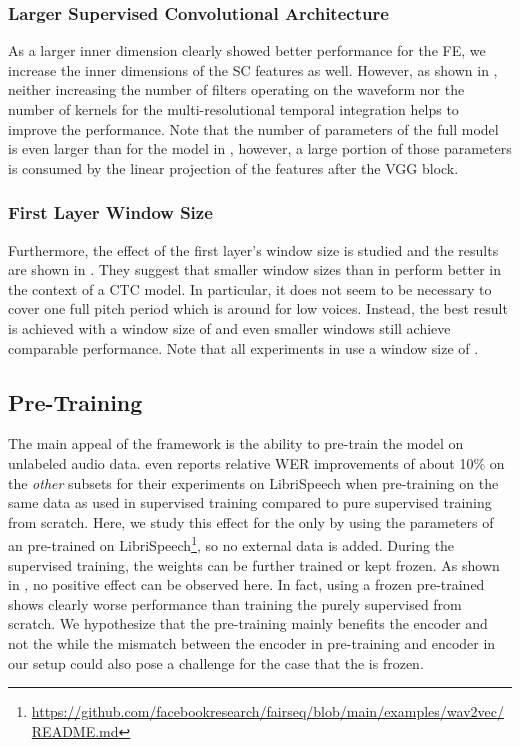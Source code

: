 \documentclass{INTERSPEECH2023}
\begin{document}
\subsubsection{Larger Supervised Convolutional Architecture}
\label{sec:scf_size}
As a larger inner dimension clearly showed better performance for the \wvtwo \gls{FE}, we increase the inner dimensions of the \gls{SC} features as well.
However, as shown in , neither increasing the number of filters operating on the waveform nor the number of kernels for the multi-resolutional temporal integration helps to improve the performance.
Note that the number of parameters of the full model is even larger than for the \wvtwo model in , however, a large portion of those parameters is consumed by the linear projection of the features after the \gls{VGG} block.


\subsubsection{First Layer Window Size}
\label{sec:scf_first_window}
Furthermore, the effect of the first layer's window size is studied and the results are shown in .
They suggest that smaller window sizes than in \cite{tuske2018:waveform} perform better in the context of a \conformer \gls{CTC} model.
In particular, it does not seem to be necessary to cover one full pitch period which is around  for low voices.
Instead, the best result is achieved with a window size of  and even smaller windows still achieve comparable performance.
Note that all experiments in  use a window size of .


\subsection{\wvtwo Pre-Training}
The main appeal of the \wvtwo framework is the ability to pre-train the model on unlabeled audio data.
\cite{facebook2020wav2vec2} even reports relative \gls{WER} improvements of about 10\% on the \textit{other} subsets for their experiments on LibriSpeech when pre-training on the same data as used in supervised training compared to pure supervised training from scratch.
Here, we study this effect for the \fe only by using the parameters of an \fe pre-trained on LibriSpeech\footnote{\raggedright\url{https://github.com/facebookresearch/fairseq/blob/main/examples/wav2vec/README.md}}, so no external data is added.
During the supervised training, the \fe weights can be further trained or kept frozen.
As shown in , no positive effect can be observed here.
In fact, using a frozen pre-trained \fe shows clearly worse performance than training the \fe purely supervised from scratch.
We hypothesize that the pre-training mainly benefits the \transformer encoder and not the \fe while the mismatch between the \transformer encoder in pre-training and \conformer encoder in our setup could also pose a challenge for the case that the \fe is frozen.

\end{document}
